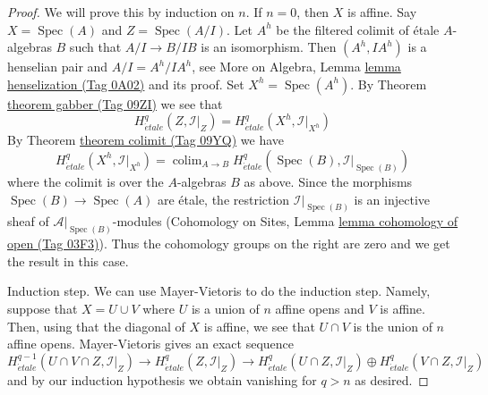 \documentclass{amsart}
\theoremstyle{plain}
\theoremstyle{definition}
\theoremstyle{remark}
\numberwithin{equation}{subsection}
\def\colim{\mathop{\mathrm{colim}}\nolimits}
\def\Spec{\mathop{\mathrm{Spec}}}
\def\etale{{\acute{e}tale}}
\begin{document}
\begin{proof}
We will prove this by induction on $n$. If $n = 0$, then $X$ is affine.
Say $X = \Spec(A)$ and $Z = \Spec(A/I)$. Let $A^h$ be the filtered colimit
of \'etale $A$-algebras $B$ such that $A/I \to B/IB$ is an isomorphism.
Then $(A^h, IA^h)$ is a henselian pair and $A/I = A^h/IA^h$, see
More on Algebra, Lemma \href{https://stacks.math.columbia.edu/tag/0A02}{lemma henselization (Tag 0A02)}
and its proof. Set $X^h = \Spec(A^h)$.
By Theorem \href{https://stacks.math.columbia.edu/tag/09ZI}{theorem gabber (Tag 09ZI)}
we see that
$$
H^q_\etale(Z, \mathcal{I}|_Z) = H^q_\etale(X^h, \mathcal{I}|_{X^h})
$$
By Theorem \href{https://stacks.math.columbia.edu/tag/09YQ}{theorem colimit (Tag 09YQ)} we have
$$
H^q_\etale(X^h, \mathcal{I}|_{X^h}) =
\colim_{A \to B} H^q_\etale(\Spec(B), \mathcal{I}|_{\Spec(B)})
$$
where the colimit is over the $A$-algebras $B$ as above.
Since the morphisms $\Spec(B) \to \Spec(A)$ are \'etale,
the restriction $\mathcal{I}|_{\Spec(B)}$ is an injective
sheaf of $\mathcal{A}|_{\Spec(B)}$-modules
(Cohomology on Sites, Lemma \href{https://stacks.math.columbia.edu/tag/03F3}{lemma cohomology of open (Tag 03F3)}).
Thus the cohomology groups on the right are zero and we get the
result in this case.

\medskip\noindent
Induction step. We can use Mayer-Vietoris to do the induction step.
Namely, suppose that $X = U \cup V$ where $U$ is a union of $n$ affine
opens and $V$ is affine. Then, using that the diagonal of $X$ is affine,
we see that $U \cap V$ is the union of $n$ affine opens. Mayer-Vietoris
gives an exact sequence
$$
H^{q - 1}_\etale(U \cap V \cap Z, \mathcal{I}|_Z) \to
H^q_\etale(Z, \mathcal{I}|_Z) \to
H^q_\etale(U \cap Z, \mathcal{I}|_Z) \oplus
H^q_\etale(V \cap Z, \mathcal{I}|_Z)
$$
and by our induction hypothesis we obtain vanishing for $q > n$ as desired.
\end{proof}
\end{document}
